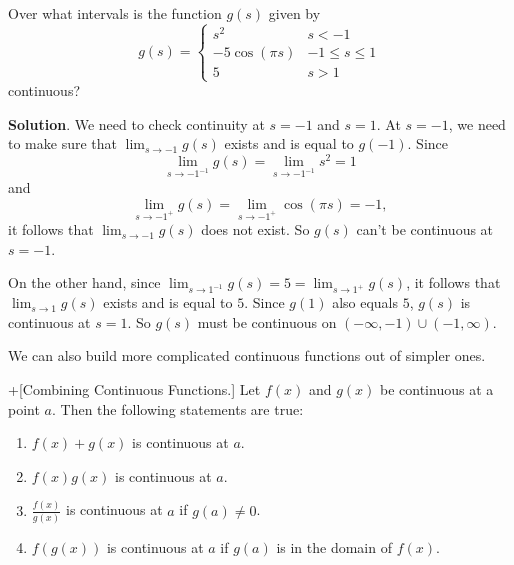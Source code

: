 \documentclass[10pt,]{book}
\theoremstyle{ptxplainnotitle}
\theoremstyle{ptxplaintitle}
\theoremstyle{ptxplainnotitle}
\theoremstyle{ptxplaintitle}
\theoremstyle{ptxplainnotitle}
\theoremstyle{ptxplaintitle}
\theoremstyle{ptxdefinitionnotitle}
\theoremstyle{ptxdefinitiontitle}
\theoremstyle{ptxdefinitionnotitle}
\theoremstyle{ptxdefinitiontitle}
\theoremstyle{ptxdefinitionnotitle}
\theoremstyle{ptxdefinitiontitle}
\theoremstyle{ptxdefinitionnotitle}
\theoremstyle{ptxdefinitiontitle}
\theoremstyle{ptxdefinitionnotitle}
\theoremstyle{ptxdefinitiontitle}
\numberwithin{equation}{section}
\begin{document}
\begin{example}\label{example-another-piecewise-function}
\hypertarget{p-43}{}%
Over what intervals is the function \(g(s)\) given by%
\begin{equation*}
g(s) = \begin{cases} s^{2} & s<-1 \\ -5\cos (\pi s) & -1\leq s\leq 1 \\ 5 & s> 1 \end{cases}
\end{equation*}
continuous?%
\par\smallskip%
\noindent\textbf{Solution}.\hypertarget{solution-8}{}\quad%
\hypertarget{p-44}{}%
We need to check continuity at \(s=-1\) and \(s=1\). At \(s=-1\), we need to make sure that \(\lim_{s\to -1}g(s)\) exists and is equal to \(g(-1)\). Since%
\begin{equation*}
\lim_{s\to-1^{-1}}g(s) = \lim_{s\to-1^{-1}}s^{2} = 1
\end{equation*}
and%
\begin{equation*}
\lim_{s\to-1^{+}}g(s) = \lim_{s\to-1^{+}}\cos(\pi s) = -1,
\end{equation*}
it follows that \(\lim_{s\to-1}g(s)\) does not exist. So \(g(s)\) can't be continuous at \(s=-1\).%
\par
\hypertarget{p-45}{}%
On the other hand, since \(\lim_{s\to1^{-1}}g(s) = 5 = \lim_{s\to1^{+}}g(s)\), it follows that \(\lim_{s\to1}g(s)\) exists and is equal to \(5\). Since \(g(1)\) also equals \(5\), \(g(s)\) is continuous at \(s=1\). So \(g(s)\) must be continuous on \((-\infty, -1)\cup(-1,\infty)\).%
\end{example}
\hypertarget{p-46}{}%
We can also build more complicated continuous functions out of simpler ones.%
\begin{theorem}+[{Combining Continuous Functions.}]\label{theorem-combining-continuous-functions}
\hypertarget{p-47}{}%
Let \(f(x)\) and \(g(x)\) be continuous at a point \(a\). Then the following statements are true: \leavevmode%
\begin{enumerate}
\item\hypertarget{li-1}{}\(f(x)+g(x)\) is continuous at \(a\).%
\item\hypertarget{li-2}{}\(f(x)g(x)\) is continuous at \(a\).%
\item\hypertarget{li-3}{}\(\frac{f(x)}{g(x)}\) is continuous at \(a\) if \(g(a)\neq0\).%
\item\hypertarget{li-4}{}\(f(g(x))\) is continuous at \(a\) if \(g(a)\) is in the domain of \(f(x)\).%
\end{enumerate}
%
\end{theorem}
\end{document}

